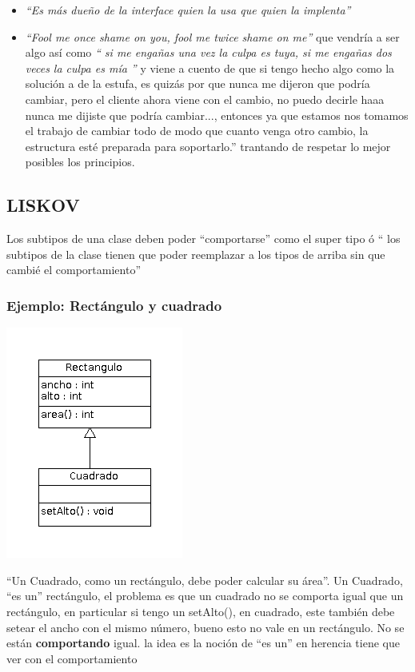 \documentclass[10pt,a4paper]{article}
\begin{document}
\begin{itemize}
\item \textit{``Es más dueño de la interface quien la usa que quien la implenta''}
\item \textit{``Fool me once shame on you, fool me twice shame on me''}
que vendría a ser algo así como \textit{`` si me engañas una vez la culpa es tuya, si me engañas dos veces la culpa es mía ''} y viene a cuento de que si tengo hecho algo como la solución a de la estufa, es quizás por que nunca me dijeron que podría cambiar, pero el cliente ahora viene con el cambio, no puedo decirle haaa nunca me dijiste que podría cambiar..., entonces ya que estamos nos tomamos el trabajo de cambiar todo de modo que cuanto venga otro cambio, la estructura esté preparada para soportarlo.'' trantando de respetar lo mejor posibles los principios.

\end{itemize}




\subsection{LISKOV}
Los subtipos de una clase deben poder ``comportarse'' como el super tipo ó 
`` los subtipos de la clase tienen que poder reemplazar a los tipos de arriba sin que cambié
el comportamiento''


\subsubsection{Ejemplo: Rectángulo y cuadrado}
\begin{center}
\includegraphics[scale=0.6]{./img/rectangulo-cuadrado.png} 
\end{center}

``Un Cuadrado, como un rectángulo, debe poder calcular su área''.
Un Cuadrado, ``es un'' rectángulo, el problema es que un cuadrado no se comporta igual que un 
rectángulo, en particular si tengo un setAlto(), en cuadrado, este también debe setear el ancho con el mismo número, bueno esto no vale en un rectángulo. No se están \textbf{comportando} igual.
la idea es la noción de ``es un'' en herencia tiene que ver con el comportamiento
\end{document}
